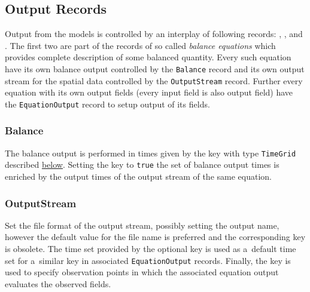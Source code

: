\subsection{Output Records}
Output from the models is controlled by an interplay of following records: ,
, and . The first two are part of the 
records of so called {\it balance equations} which provides complete description of some balanced quantity. 
Every such equation have its own balance output controlled by the \verb'Balance' record and its own output stream for the 
spatial data controlled by the \verb'OutputStream' record. Further every equation with its own output fields 
(every input field is also output field) have the \verb'EquationOutput' record to setup output of its fields.

\subsubsection{Balance}
The balance output is performed in times given by the key 
with type \verb'TimeGrid' described \hyperlink{sec:TimeGrid}{below}. Setting the key  
to \verb'true' the set of balance output times is enriched by the output times of the output stream of the same equation.

\subsubsection{OutputStream}
Set the file format of the output stream, possibly setting the output name, however the default value for the file name is preferred and the corresponding key 
 is obsolete.
The time set provided by the optional key  is used as a~default time set for a~similar key in associated 
\verb'EquationOutput' records. Finally, the key  is used to specify observation points
in which the associated equation output evaluates the observed fields.


